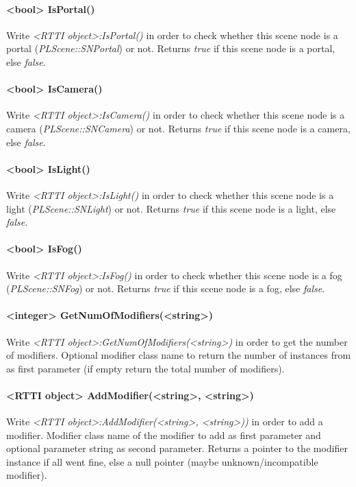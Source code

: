 \paragraph{<bool> IsPortal()}
Write \emph{<RTTI object>:IsPortal()} in order to check whether this scene node is a portal (\emph{PLScene::SNPortal}) or not. Returns \emph{true} if this scene node is a portal, else \emph{false}.

\paragraph{<bool> IsCamera()}
Write \emph{<RTTI object>:IsCamera()} in order to check whether this scene node is a camera (\emph{PLScene::SNCamera}) or not. Returns \emph{true} if this scene node is a camera, else \emph{false}.

\paragraph{<bool> IsLight()}
Write \emph{<RTTI object>:IsLight()} in order to check whether this scene node is a light (\emph{PLScene::SNLight}) or not. Returns \emph{true} if this scene node is a light, else \emph{false}.

\paragraph{<bool> IsFog()}
Write \emph{<RTTI object>:IsFog()} in order to check whether this scene node is a fog (\emph{PLScene::SNFog}) or not. Returns \emph{true} if this scene node is a fog, else \emph{false}.

\paragraph{<integer> GetNumOfModifiers(<string>)}
Write \emph{<RTTI object>:GetNumOfModifiers(<string>)} in order to get the number of modifiers. Optional modifier class name to return the number of instances from as first parameter (if empty return the total number of modifiers).

\paragraph{<RTTI object> AddModifier(<string>, <string>)}
Write \emph{<RTTI object>:AddModifier(<string>, <string>))} in order to add a modifier. Modifier class name of the modifier to add as first parameter and optional parameter string as second parameter. Returns a pointer to the modifier instance if all went fine, else a null pointer (maybe unknown/incompatible modifier).

